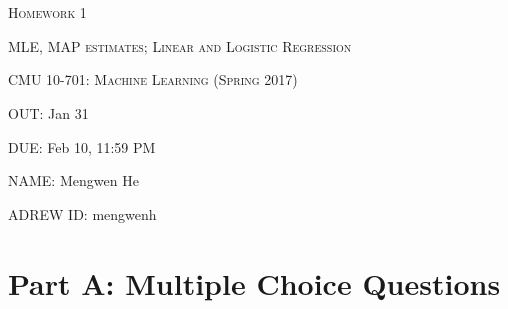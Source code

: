 \documentclass{article}
\begin{document}
\section*{}
\begin{center}
  \centerline{\textsc{\LARGE Homework 1}}
  \vspace{0.5em}
  \centerline{\textsc{\Large MLE, MAP estimates; Linear and Logistic Regression}}
  \vspace{1em}
  \textsc{\large CMU 10-701: Machine Learning (Spring 2017)} \\
  \vspace{1em}
  \centerline{OUT: Jan 31}
  \centerline{DUE: Feb 10, 11:59 PM}
  \centerline{NAME: Mengwen He}
  \centerline{ADREW ID: mengwenh}
	
\end{center}

\section*{Part A: Multiple Choice Questions}
\end{document}
